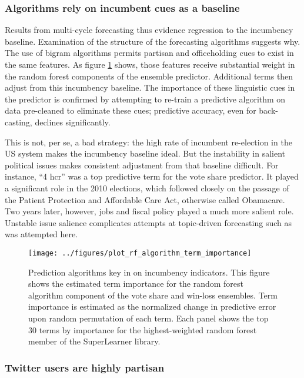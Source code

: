 \documentclass{article}
\begin{document}
\subsubsection{Algorithms rely on incumbent cues as a baseline}
\label{sec:algor-behav-perf}

Results from multi-cycle forecasting thus evidence regression to
the incumbency baseline. Examination of the structure of the
forecasting algorithms suggests why. The use of
bigram algorithms permits partisan and officeholding cues to exist in
the same features. As figure \ref{fig:rf-term-importance} shows, those
features receive substantial weight in the random forest components of
the ensemble predictor. Additional terms then adjust from this incumbency baseline. The
importance of these linguistic cues in the predictor is confirmed by
attempting to re-train a predictive algorithm on data pre-cleaned to
eliminate these cues; predictive accuracy, even for back-casting,
declines significantly.

This is not, per se, a bad strategy: the high rate of incumbent
re-election in the US system makes the incumbency baseline ideal. But
the instability in salient political issues makes consistent
adjustment from that baseline difficult. For instance, ``4 hcr'' was a
top predictive term for the vote share predictor. It played a
significant role in the 2010 elections, which followed closely on the
passage of the Patient Protection and Affordable Care Act, otherwise
called Obamacare. Two years later, however, jobs and fiscal policy
played a much more salient role. Unstable issue salience complicates
attempts at topic-driven forecasting such as was attempted here.

\begin{figure}[ht]
  \centering
  \texttt{[image: ../figures/plot\_rf\_algorithm\_term\_importance]}
  \caption{Prediction algorithms key in on incumbency
    indicators. This figure shows the estimated term importance for the random forest algorithm component
    of the vote share and win-loss ensembles. Term importance is
    estimated as the normalized change in predictive error upon
    random permutation of each term. Each panel shows the top
    30 terms by importance for the highest-weighted random forest
    member of the SuperLearner library.}
  \label{fig:rf-term-importance}
\end{figure}

\subsubsection{Twitter users are highly partisan}
\label{sec:part-cont-twitt}
\end{document}
